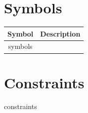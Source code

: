 \documentclass{article}
\begin{document}
\section{Symbols}
\begin{table}
\begin{tabular}{c|p{4in}}
  Symbol & Description \\
  \hline \hline
  {{ symbols }}
\hline \hline
\end{tabular}
\end{table}
\section{Constraints}
{{ constraints }}
\end{document}
